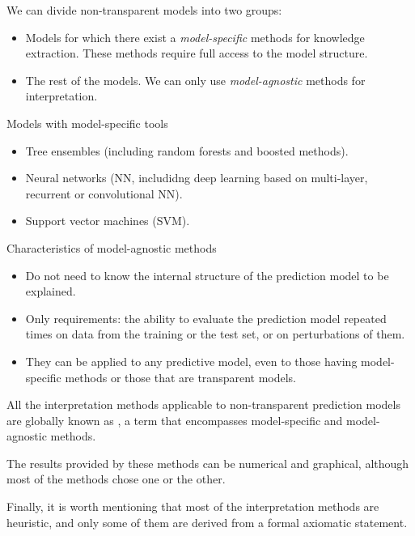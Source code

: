 We can divide non-transparent models into two groups:
\begin{itemize}
	\item Models for which there exist a \emph{model-specific} methods
	      for knowledge extraction. These methods require full access to the model
	      structure.
	\item The rest of the models. We can only use \emph{model-agnostic} methods
	      for interpretation.
\end{itemize}

\begin{example}{Models with model-specific tools}{}
	\begin{itemize}
		\item Tree ensembles (including random forests and boosted methods).
		\item Neural networks (NN, includidng deep learning based on
		      multi-layer, recurrent or convolutional NN).
		\item Support vector machines (SVM).
	\end{itemize}
\end{example}

\begin{example}{Characteristics of model-agnostic methods}{}
	\begin{itemize}
		\item Do not need to know the internal structure of the prediction
		      model to be explained.
		\item Only requirements: the ability to evaluate the prediction model
		      repeated times on data from the training or the
		      test set, or on perturbations of them.
		\item They can be applied to any predictive model, even to those
		      having model-specific methods or those that are
		      transparent models.
	\end{itemize}
\end{example}

All the interpretation methods applicable to non-transparent prediction
models are  globally known as ,
a term that encompasses model-specific and model-agnostic methods.

The results provided by these methods can be numerical and graphical,
although most of the methods chose one or the other.

Finally, it is worth mentioning that most of the interpretation
methods are heuristic, and only some of them are derived from
a formal axiomatic statement.

